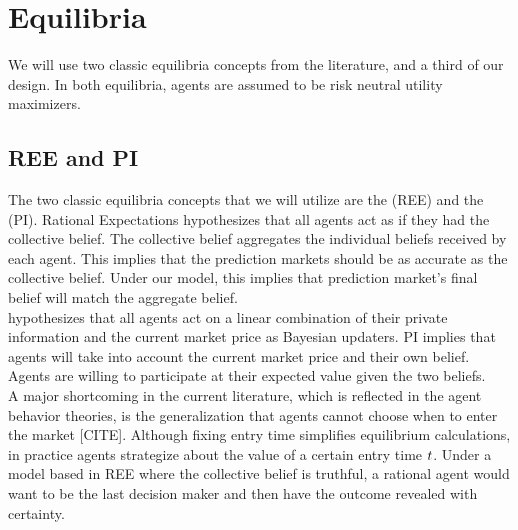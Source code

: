 \section{Equilibria}
We will use two classic equilibria concepts from the literature, and a third of our design. In both equilibria, agents are assumed to be risk neutral utility maximizers.

\subsection{REE and PI}
The two classic equilibria concepts that we will utilize are the  (REE) and the  (PI). Rational Expectations hypothesizes that all agents act as if they had the collective belief. The collective belief aggregates the individual beliefs received by each agent. This implies that the prediction markets should be as accurate as the collective belief. Under our model, this implies that prediction market's final belief will match the aggregate belief.\\

 hypothesizes that all agents act on a linear combination of their private information and the current market price as Bayesian updaters. PI implies that agents will take into account the current market price and their own belief. Agents are willing to participate at their expected value given the two beliefs. \\

A major shortcoming in the current literature, which is reflected in the agent behavior theories, is the generalization that agents cannot choose when to enter the market [CITE]. Although fixing entry time simplifies equilibrium calculations, in practice agents strategize about the value of a certain entry time $t$. Under a model based in REE where the collective belief is truthful, a rational agent would want to be the last decision maker and then have the outcome revealed with certainty.\\

